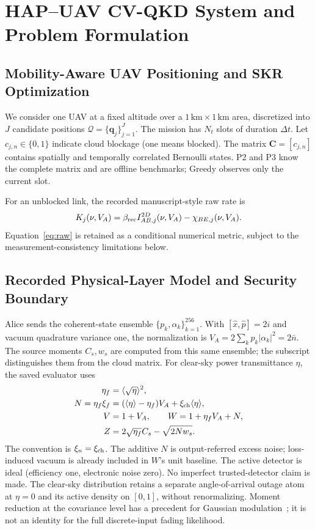 \section{HAP--UAV CV-QKD System and Problem Formulation}
\label{sec:system}
\subsection{Mobility-Aware UAV Positioning and SKR Optimization}
We consider one UAV at a fixed altitude over a $1\,\mathrm{km}\times
1\,\mathrm{km}$ area, discretized into $J$ candidate positions
$\mathcal Q=\{\mathbf q_j\}_{j=1}^J$. The mission has $N_t$ slots of
duration $\Delta t$. Let $c_{j,n}\in\{0,1\}$ indicate cloud blockage
(one means blocked). The matrix $\mathbf C=[c_{j,n}]$ contains spatially
and temporally correlated Bernoulli states. P2 and P3 know the complete
matrix and are offline benchmarks; Greedy observes only the current slot.

For an unblocked link, the recorded manuscript-style raw rate is
\begin{equation}
 K_j(\nu,V_A)=\beta_{\rm rec}I_{AB,j}^{2D}(\nu,V_A)-\chi_{BE,j}(\nu,V_A).
 \label{eq:raw}
\end{equation}
Equation~\eqref{eq:raw} is retained as a conditional numerical metric,
subject to the measurement-consistency limitations below.

\subsection{Recorded Physical-Layer Model and Security Boundary}
\label{sec:security}
Alice sends the coherent-state ensemble $\{p_k,\alpha_k\}_{k=1}^{256}$.
With $[\hat x,\hat p]=2i$ and vacuum quadrature variance one, the
normalization is $V_A=2\sum_kp_k|\alpha_k|^2=2\bar n$.
The source moments $C_s,w_s$ are computed from this same ensemble;
the subscript distinguishes them from the cloud matrix.
For clear-sky power transmittance $\eta$, the saved evaluator uses
\begin{align*}
 \eta_f&=\langle\sqrt\eta\rangle^2,\\
 N=\eta_f\xi_f&=(\langle\eta\rangle-\eta_f)V_A
                  +\xi_{\rm ch}\langle\eta\rangle,\\
 V&=1+V_A,\qquad W=1+\eta_fV_A+N,\\
 Z&=2\sqrt{\eta_f}C_s-\sqrt{2Nw_s}.
\end{align*}
The convention is $\xi_n=\xi_{\rm ch}$. The additive $N$ is
output-referred excess noise; loss-induced vacuum is already included
in $W$'s unit baseline. The active detector is ideal (efficiency one,
electronic noise zero). No imperfect trusted-detector claim is made.
The clear-sky distribution retains a separate angle-of-arrival outage
atom at $\eta=0$ and its active density on $[0,1]$, without renormalizing.
Moment reduction at the covariance level has a precedent for Gaussian
modulation~\cite{usenko2012}; it is not an identity for the full
discrete-input fading likelihood.

